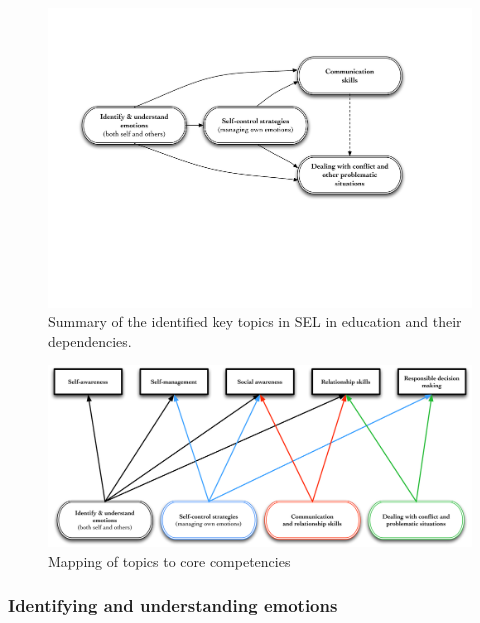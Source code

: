 \documentclass[prodmode,acmtochi]{acmsmall}
\newcommand{\GeraldineFIX}[1]{}
\begin{document}
 
\begin{figure}
  \centering
        \includegraphics[width=\columnwidth]{images/BuildingBlocks.pdf}
        \caption{Summary of the identified key topics in SEL in education and their dependencies.\GeraldineFIX{G: make clearer that this represents your summary of key topics and dependencied}}
        \label{fig:depfoc}
\end{figure}

\begin{figure}
  \centering
        \includegraphics[width=\columnwidth]{images/Blocks-to-competencies.pdf}
        \caption{Mapping of topics to core competencies}
        \label{fig:strmap}
\end{figure}


\subsubsection{Identifying and understanding emotions} 
\end{document}
